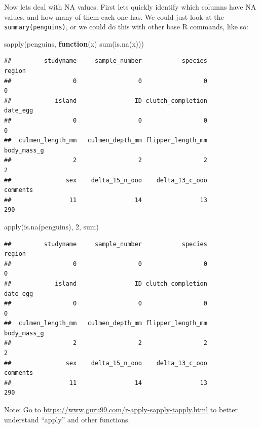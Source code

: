 \documentclass[
]{book}
\newenvironment{Shaded}{\begin{snugshade}}{\end{snugshade}}
\newcommand{\ControlFlowTok}[1]{\textcolor[rgb]{0.13,0.29,0.53}{\textbf{#1}}}
\newcommand{\DecValTok}[1]{\textcolor[rgb]{0.00,0.00,0.81}{#1}}
\newcommand{\FunctionTok}[1]{\textcolor[rgb]{0.00,0.00,0.00}{#1}}
\newcommand{\NormalTok}[1]{#1}
\begin{document}
Now lets deal with NA values.
First lets quickly identify which columns have NA values, and how many of them each one has.
We could just look at the \texttt{summary(penguins)}, or we could do this with other base R commands, like so:

\begin{Shaded}
\begin{Highlighting}[]
\FunctionTok{sapply}\NormalTok{(penguins, }\ControlFlowTok{function}\NormalTok{(x) }\FunctionTok{sum}\NormalTok{(}\FunctionTok{is.na}\NormalTok{(x)))}
\end{Highlighting}
\end{Shaded}

\begin{verbatim}
##         studyname     sample_number           species            region 
##                 0                 0                 0                 0 
##            island                ID clutch_completion          date_egg 
##                 0                 0                 0                 0 
##  culmen_length_mm   culmen_depth_mm flipper_length_mm       body_mass_g 
##                 2                 2                 2                 2 
##               sex    delta_15_n_ooo    delta_13_c_ooo          comments 
##                11                14                13               290
\end{verbatim}

\begin{Shaded}
\begin{Highlighting}[]
\FunctionTok{apply}\NormalTok{(}\FunctionTok{is.na}\NormalTok{(penguins), }\DecValTok{2}\NormalTok{, sum)}
\end{Highlighting}
\end{Shaded}

\begin{verbatim}
##         studyname     sample_number           species            region 
##                 0                 0                 0                 0 
##            island                ID clutch_completion          date_egg 
##                 0                 0                 0                 0 
##  culmen_length_mm   culmen_depth_mm flipper_length_mm       body_mass_g 
##                 2                 2                 2                 2 
##               sex    delta_15_n_ooo    delta_13_c_ooo          comments 
##                11                14                13               290
\end{verbatim}

Note: Go to \url{https://www.guru99.com/r-apply-sapply-tapply.html} to better understand ``apply'' and other functions.
\end{document}
